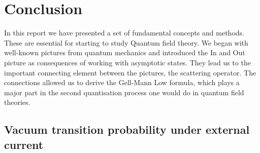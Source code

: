 \documentclass[12pt, titlepage]{article}
\begin{document}
\section{Conclusion}
In this report we have presented a set of fundamental concepts and methods. These are essential for starting to study Quantum field theory. We began with well-known pictures from quantum mechanics and introduced the In and Out picture as consequences of working with asymptotic states. They lead us to the important connecting element between the pictures, the scattering operator. The connections allowed us to derive the Gell-Mann Low formula, which plays a major part in the second quantisation process one would do in quantum field theories. 
\newpage
\begin{subappendices}
\subsection{Vacuum transition probability under external current}
%

\end{subappendices}
\end{document}
